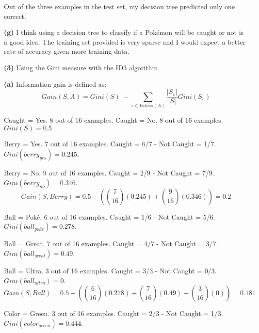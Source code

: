 \documentclass[11pt]{article}
\renewcommand\part[1]{\vspace{.10in}\textbf{(#1)}}
\begin{document}
Out of the three examples in the test set, my decision tree predicted only one correct.

 \par 

\part{g} I think using a decision tree to classify if a Pok\'{e}mon will be caught or not is a good idea. The training set provided is very sparse and I would expect a better rate of accuracy given more training data.

\part{3} Using the Gini measure with the ID3 algorithm.

\qquad \part{a} Information gain is defined as:
$$Gain(S, A) = Gini(S)\  - \sum_{v\in Values(A)} \frac{|S_v|}{|S|} Gini(S_v)$$

Caught = Yes. 8 out of 16 examples. Caught = No. 8 out of 16 examples. $Gini(S) = 0.5$ \newline

Berry = Yes. 7 out of 16 examples. Caught = 6/7 - Not Caught = 1/7. $Gini(berry_{yes}) = 0.245$.
 
Berry = No. 9 out of 16 examples. Caught = 2/9 - Not Caught = 7/9. $Gini(berry_{no}) = 0.346$.
$$Gain(S, Berry) = 0.5 - ((\frac{7}{16})(0.245) + (\frac{9}{16})(0.346)) = 0.2$$

 \par

Ball = Pok\'{e}. 6 out of 16 examples. Caught = 1/6 - Not Caught = 5/6. $Gini(ball_{poke}) = 0.278$.

Ball = Great. 7 out of 16 examples. Caught = 4/7 - Not Caught = 3/7. $Gini(ball_{great}) = 0.49$.

Ball = Ultra. 3 out of 16 examples. Caught = 3/3 - Not Caught = 0/3. $Gini(ball_{ultra}) = 0$.
$$Gain(S, Ball) = 0.5 - ((\frac{6}{16})(0.278) + (\frac{7}{16})(0.49) + (\frac{3}{16})(0)) = 0.181$$

 \par

Color = Green. 3 out of 16 examples. Caught = 2/3 - Not Caught = 1/3. $Gini(color_{green}) = 0.444$.
\end{document}
